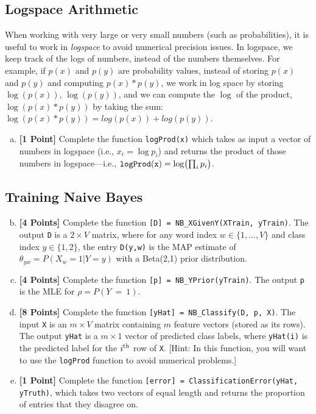 \documentclass{article}
\newcommand \code [1]{{\tt #1}}
\begin{document}
\subsection*{Logspace Arithmetic}

When working with very large or very small numbers (such as
probabilities), it is useful to work in \emph{logspace} to avoid
numerical precision issues. In logspace, we keep track of the logs of
numbers, instead of the numbers themselves. For example, if $p(x)$ and
$p(y)$ are probability values, instead of storing $p(x)$ and $p(y)$
and computing $p(x) * p(y)$, we work in log space by storing
$\log(p(x))$, $\log(p(y))$, and we can compute the $\log$ of the
product, $\log(p(x) * p(y))$ by taking the sum:
$\log(p(x) * p(y)) = log(p(x)) + log(p(y))$.

\begin{enumerate}[(a)]
\item {\bf [1 Point]} Complete the function \code{logProd(x)} which
  takes as input a vector of numbers in logspace (i.e.,
  $x_i = \log p_i$) and returns the product of those numbers in
  logspace---i.e., $\code{logProd(x)} = \log\bigl(\prod_i p_i\bigr)$.
\end{enumerate}

\subsection*{Training Naive Bayes}

\begin{enumerate}[(a)]
\setcounter{enumi}{1}

\item {\bf [4 Points]} Complete the function \code{[D] =
    NB\_XGivenY(XTrain, yTrain)}. The output \code{D} is a
  $2 \times V$ matrix, where for any word index $w \in \{1,\dots, V\}$
  and class index $y \in \{1,2\}$, the entry \code{D(y,w)} is the MAP
  estimate of $\theta_{yw} = P(X_w = 1 | Y = y)$ with a Beta(2,1)
  prior distribution.

\item {\bf [4 Points]} Complete the function \code{[p] =
    NB\_YPrior(yTrain)}. The output \code{p} is the MLE for
  $\rho = P(Y~=~1)$.

\item {\bf [8 Points]} Complete the function \code{[yHat] =
    NB\_Classify(D, p, X)}. The input \code{X} is an $m \times V$
  matrix containing $m$ feature vectors (stored as its rows). The
  output \code{yHat} is a $m \times 1$ vector of predicted class
  labels, where \code{yHat(i)} is the predicted label for the
  $i^{\rm th}$ row of \code{X}. [Hint: In this function, you will want
  to use the \code{logProd} function to avoid numerical problems.]

\item {\bf [1 Point]} Complete the function \code{[error] =
    ClassificationError(yHat, yTruth)}, which takes two vectors of
  equal length and returns the proportion of entries that they
  disagree on.
\end{enumerate}
\end{document}
